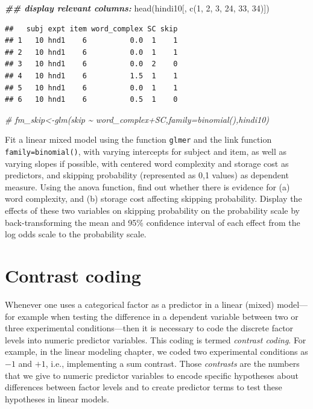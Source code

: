 \documentclass[
  12pt,
]{krantz}
\newenvironment{Shaded}{\begin{snugshade}}{\end{snugshade}}
\newcommand{\CommentTok}[1]{\textcolor[rgb]{0.56,0.35,0.01}{\textit{#1}}}
\newcommand{\DecValTok}[1]{\textcolor[rgb]{0.00,0.00,0.81}{#1}}
\newcommand{\DocumentationTok}[1]{\textcolor[rgb]{0.56,0.35,0.01}{\textbf{\textit{#1}}}}
\newcommand{\FunctionTok}[1]{\textcolor[rgb]{0.00,0.00,0.00}{#1}}
\newcommand{\NormalTok}[1]{#1}
\theoremstyle{definition}
\theoremstyle{definition}
\theoremstyle{definition}
\theoremstyle{definition}
\theoremstyle{remark}
\begin{document}
\begin{Shaded}
\begin{Highlighting}[]
\DocumentationTok{\#\# display relevant columns:}
\FunctionTok{head}\NormalTok{(hindi10[, }\FunctionTok{c}\NormalTok{(}\DecValTok{1}\NormalTok{, }\DecValTok{2}\NormalTok{, }\DecValTok{3}\NormalTok{, }\DecValTok{24}\NormalTok{, }\DecValTok{33}\NormalTok{, }\DecValTok{34}\NormalTok{)])}
\end{Highlighting}
\end{Shaded}

\begin{verbatim}
##   subj expt item word_complex SC skip
## 1   10 hnd1    6          0.0  1    1
## 2   10 hnd1    6          0.0  1    1
## 3   10 hnd1    6          0.0  2    0
## 4   10 hnd1    6          1.5  1    1
## 5   10 hnd1    6          0.0  1    1
## 6   10 hnd1    6          0.5  1    0
\end{verbatim}

\begin{Shaded}
\begin{Highlighting}[]
\CommentTok{\# fm\_skip\textless{}{-}glm(skip \textasciitilde{} word\_complex+SC,family=binomial(),hindi10)}
\end{Highlighting}
\end{Shaded}

Fit a linear mixed model using the function \texttt{glmer} and the link function \texttt{family=binomial()}, with varying intercepts for subject and item, as well as varying slopes if possible, with centered word complexity and storage cost as predictors, and skipping probability (represented as 0,1 values) as dependent measure. Using the anova function, find out whether there is evidence for (a) word complexity, and (b) storage cost affecting skipping probability. Display the effects of these two variables on skipping probability on the probability scale by back-transforming the mean and 95\% confidence interval of each effect from the log odds scale to the probability scale.

\hypertarget{ch:contr}{%
\chapter{Contrast coding}\label{ch:contr}}

Whenever one uses a categorical factor as a predictor in a linear (mixed) model---for example when testing the difference in a dependent variable between two or three experimental conditions---then it is necessary to code the discrete factor levels into numeric predictor variables. This coding is termed \emph{contrast coding}. For example, in the linear modeling chapter, we coded two experimental conditions as \(-1\) and \(+1\), i.e., implementing a sum contrast. Those \emph{contrasts} are the numbers that we give to numeric predictor variables to encode specific hypotheses about differences between factor levels and to create predictor terms to test these hypotheses in linear models.
\end{document}
